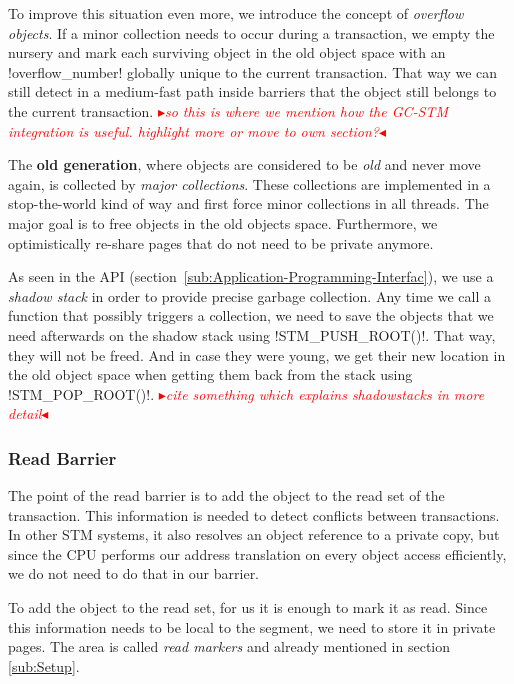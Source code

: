 \documentclass{sigplanconf}
\makeatletter
\renewcommand\lstinline[1][]{%
  \Collectverb{\@@myverb}%
}
\def\@@myverb#1{%
    \begingroup
    \fboxsep=0.2em
    \colorbox{verylightgray}{\oldlstinline|#1|}%
    \endgroup
}
\newcommand{\mynote}[2]{%
  \textcolor{red}{%
    \fbox{\bfseries\sffamily\scriptsize#1}%
    {\small$\blacktriangleright$\textsf{\emph{#2}}$\blacktriangleleft$}%
  }%
}
\newcommand\remi[1]{\mynote{Remi}{#1}}
\makeatother
\begin{document}
To improve this situation even more, we introduce the concept of
\emph{overflow objects}. If a minor collection needs to occur during a
transaction, we empty the nursery and mark each surviving object in
the old object space with an \lstinline!overflow_number!  globally
unique to the current transaction. That way we can still detect in a
medium-fast path inside barriers that the object still belongs to the
current transaction. \remi{so this is where we mention how the GC-STM
integration is useful. highlight more or move to own section?}

The \textbf{old generation}, where objects are considered to be
\emph{old} and never move again, is collected by \emph{major
  collections}.  These collections are implemented in a stop-the-world
kind of way and first force minor collections in all threads. The
major goal is to free objects in the old objects space. Furthermore,
we optimistically re-share pages that do not need to be private
anymore.

As seen in the API (section~\ref{sub:Application-Programming-Interfac}),
we use a \emph{shadow stack} in order to provide precise garbage
collection.  Any time we call a function that possibly triggers a
collection, we need to save the objects that we need afterwards on the
shadow stack using \lstinline!STM_PUSH_ROOT()!.  That way, they will
not be freed. And in case they were young, we get their new location
in the old object space when getting them back from the stack using
\lstinline!STM_POP_ROOT()!. \remi{cite something which explains
shadowstacks in more detail}




\subsubsection{Read Barrier}

The point of the read barrier is to add the object to the read set of
the transaction. This information is needed to detect conflicts
between transactions. In other STM systems, it also resolves an object reference to
a private copy, but since the CPU performs our address translation on
every object access efficiently, we do not need to do that in our
barrier.

To add the object to the read set, for us it is enough to mark it as
read. Since this information needs to be local to the segment, we need
to store it in private pages. The area is called \emph{read markers}
and already mentioned in section \ref{sub:Setup}.
\end{document}
